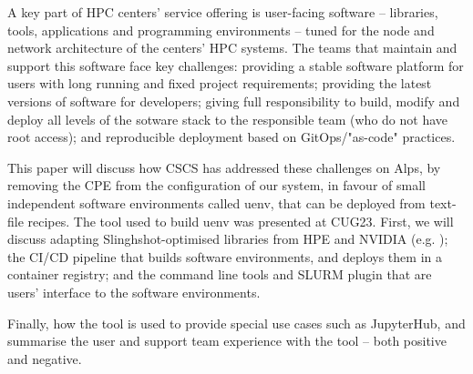 A key part of HPC centers' service offering is user-facing software -- libraries, tools, applications and programming environments -- tuned for the node and network architecture of the centers' HPC systems.
The teams that maintain and support this software face key challenges: providing a stable software platform for users with long running and fixed project requirements;  providing the latest versions of software for developers; giving full responsibility to build, modify and deploy all levels of the sotware stack to the responsible team (who do not have root access); and reproducible deployment based on GitOps/"as-code" practices.

This paper will discuss how CSCS has addressed these challenges on Alps, by removing the CPE from the configuration of our system, in favour of small independent software environments called uenv, that can be deployed from text-file recipes.
The tool used to build uenv was presented at CUG23.
First, we will discuss adapting Slinghshot-optimised libraries from HPE and NVIDIA (e.g. \cufftmp); the CI/CD pipeline that builds software environments, and deploys them in a container registry; and the command line tools and SLURM plugin that are users' interface to the software environments.

Finally, how the tool is used to provide special use cases such as JupyterHub, and summarise the user and support team experience with the tool -- both positive and negative.


